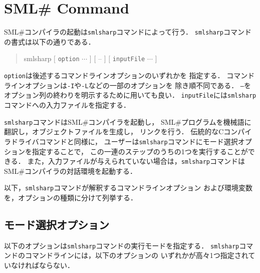 \documentclass{jbook}
\newif\ifjp
\newcommand{\txt}[2]{#2}
\newcommand{\smlsharp}{SML\#}
\newcommand{\term}[1]{\mbox{{\tt #1}}}
\newenvironment{program}{\begin{quote}\begin{tt}}%
                        {\end{tt}\end{quote}}
\begin{document}
\chapter{\txt{\smlsharp{}コンパイラの起動}{\smlsharp{} Command}}
\ifjp%

	\smlsharp{}コンパイラの起動は{\tt smlsharp}コマンドによって行う．
	{\tt smlsharp}コマンドの書式は以下の通りである．
\begin{program}
smlsharp $[$ \term{option} $\cdots$ $]$ $[$ -- $]$ $[$ \term{inputFile} $\cdots$ $]$
\end{program}
	\term{option}は後述するコマンドラインオプションのいずれかを
指定する．
	コマンドラインオプションは{\tt -I}や{\tt -L}などの一部のオプションを
除き順不同である．
	{\tt --}をオプション列の終わりを明示するために用いても良い．
	\term{inputFile}には{\tt smlsharp}コマンドへの入力ファイルを指定する．

	{\tt smlsharp}コマンドは\smlsharp{}コンパイラを起動し，
\smlsharp{}プログラムを機械語に翻訳し，オブジェクトファイルを生成し，
リンクを行う．
	伝統的なCコンパイラドライバコマンドと同様に，
ユーザーは{\tt smlsharp}コマンドにモード選択オプションを指定することで，
この一連のステップのうちの1つを実行することができる．
	また，入力ファイルが与えられていない場合は，{\tt smlsharp}コマンドは
\smlsharp{}コンパイラの対話環境を起動する．

	以下，{\tt smlsharp}コマンドが解釈するコマンドラインオプション
および環境変数を，オプションの種類に分けて列挙する．

\section{モード選択オプション}

	以下のオプションは{\tt smlsharp}コマンドの実行モードを指定する．
	{\tt smlsharp}コマンドのコマンドラインには，以下のオプションの
いずれかが高々1つ指定されていなければならない．
\end{document}
